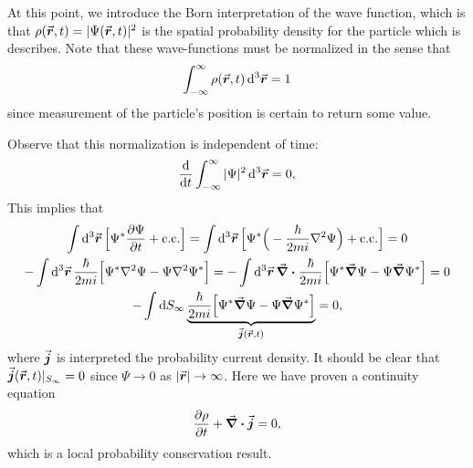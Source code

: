 At this point, we introduce the Born interpretation of the wave function, which is that $\rho(\va*{r},t) = | \Psi(\va*{r},t) |^2$ is the spatial probability density for the particle which is describes.
Note that these wave-functions must be normalized in the sense that
\begin{eqnarray}
    \int_{-\infty}^{\infty} \rho(\va*{r},t) \dd[3]{\va*{r}} = 1
\end{eqnarray}
since measurement of the particle's position is certain to return some value.

Observe that this normalization is independent of time:
\begin{eqnarray}
    \dv{t} \int_{-\infty}^{\infty} | \Psi |^2 \dd[3]{\va*{r}} = 0
,\end{eqnarray}
This implies that
\begin{gather}
    \int \dd[3]{\va*{r}} \Big[ \Psi^{*} \pdv{\Psi}{t} + {\rm c.c.} \Big] = \int \dd[3]{\va*{r}} \Big[ \Psi^{*} \Big( -\frac{\hbar}{2m i} \laplacian \Psi \Big) + {\rm c.c.} \Big] = 0 \nonumber \\
    - \int \dd[3]{\va*{r}} \frac{\hbar}{2 m i} \Big[ \Psi^{*} \laplacian \Psi - \Psi \laplacian \Psi^{*} \Big] = - \int \dd[3]{\va*{r}} \div{ \frac{\hbar}{2 m i} \Big[ \Psi^{*} \grad \Psi - \Psi \grad \Psi^{*} \Big] } = 0 \nonumber \\
    - \int \dd{S_{\infty}} \underbrace{ \frac{\hbar}{2 m i} \Big[ \Psi^{*} \grad \Psi - \Psi \grad \Psi^{*} \Big] }_{\va*{j}(\va*{r},t)} = 0
,\end{gather}
where $\va*{j}$ is interpreted the probability current density.
It should be clear that $\va*{j}(\va*{r},t)|_{S_{\infty}} = 0$ since $\Psi \rightarrow 0$ as $|\va*{r}| \rightarrow \infty$.
Here we have proven a continuity equation
\begin{eqnarray}
    \pdv{\rho}{t} + \div{\va*{j}} = 0
,\end{eqnarray}
which is a local probability conservation result.

